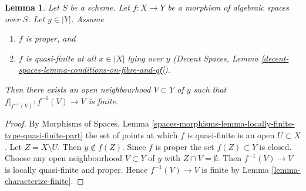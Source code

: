 \documentclass[10pt,a4paper]{amsart}
\theoremstyle{plain}
\newtheorem{lemma}[subsection]{Lemma}
\theoremstyle{definition}
\theoremstyle{remark}
\numberwithin{equation}{subsection}
\begin{document}
\begin{lemma}
\label{lemma-proper-finite-fibre-finite-in-neighbourhood}
Let $S$ be a scheme. Let $f : X \to Y$ be a morphism of algebraic spaces
over $S$. Let $y \in |Y|$. Assume
\begin{enumerate}
\item $f$ is proper, and
\item $f$ is quasi-finite at all $x \in |X|$ lying over $y$
(Decent Spaces, Lemma \ref{decent-spaces-lemma-conditions-on-fibre-and-qf}).
\end{enumerate}
Then there exists an open neighbourhood $V \subset Y$ of $y$
such that $f|_{f^{-1}(V)} : f^{-1}(V) \to V$ is finite.
\end{lemma}

\begin{proof}
By
Morphisms of Spaces, Lemma
\ref{spaces-morphisms-lemma-locally-finite-type-quasi-finite-part} the
set of points at which $f$ is quasi-finite is an open $U \subset X$.
Let $Z = X \setminus U$. Then $y \not \in f(Z)$. Since $f$ is proper
the set $f(Z) \subset Y$ is closed. Choose any open neighbourhood
$V \subset Y$ of $y$ with $Z \cap V = \emptyset$. Then
$f^{-1}(V) \to V$ is locally quasi-finite and proper.
Hence $f^{-1}(V) \to V$ is finite by Lemma \ref{lemma-characterize-finite}.
\end{proof}
\end{document}
